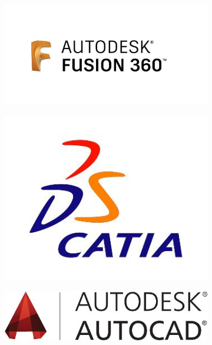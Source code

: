 \begin{figure}[!htbp]
    \centering
    \begin{subfigure}[m]{.22\linewidth}
        \centering
        \includegraphics[width=\textwidth]{assets/conception1/img125.jpg}
    \end{subfigure}
    \hfill
    \begin{subfigure}[m]{.22\linewidth}
        \centering
        \includegraphics[width=\textwidth]{assets/conception1/img127.jpg}
    \end{subfigure}
    \hfill
    \begin{subfigure}[m]{.22\linewidth}
        \centering
        \includegraphics[width=\textwidth]{assets/conception1/img129.jpg}

\end{subfigure}
\end{figure}
